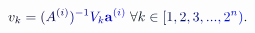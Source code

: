 \documentclass[12pt]{article}
\begin{document}
\makeatletter
\renewcommand*{\@textcolor}[3]{%
  \protect\leavevmode
  \begingroup
    \color#1{#2}#3%
  \endgroup
}
\makeatother
\begin{displaymath}
\mathcolor[RGB]{0,0,15}{v} _ { \mathcolor[RGB]{0,0,30}{k} } \mathcolor[RGB]{0,0,45}{=} \mathcolor[RGB]{0,0,60}{(} \mathcolor[RGB]{0,0,75}{A} ^ { \mathcolor[RGB]{0,0,90}{(} \mathcolor[RGB]{0,0,105}{i} \mathcolor[RGB]{0,0,120}{)} } \mathcolor[RGB]{0,0,135}{)} ^ { \mathcolor[RGB]{0,0,150}{-} \mathcolor[RGB]{0,0,165}{1} } \mathcolor[RGB]{0,0,180}{V} _ { \mathcolor[RGB]{0,0,195}{k} } \mathbf { \mathcolor[RGB]{0,0,210}{a} } ^ { \mathcolor[RGB]{0,0,225}{(} \mathcolor[RGB]{0,0,240}{i} \mathcolor[RGB]{0,0,255}{)} } \mathcolor[RGB]{0,15,0}{\;} \mathcolor[RGB]{0,15,15}{\forall} \mathcolor[RGB]{0,15,30}{k} \mathcolor[RGB]{0,15,45}{\in} \mathcolor[RGB]{0,15,60}{[} \mathcolor[RGB]{0,15,75}{1} \mathcolor[RGB]{0,15,90}{,} \mathcolor[RGB]{0,15,105}{2} \mathcolor[RGB]{0,15,120}{,} \mathcolor[RGB]{0,15,135}{3} \mathcolor[RGB]{0,15,150}{,} \mathcolor[RGB]{0,15,165}{.} \mathcolor[RGB]{0,15,180}{.} \mathcolor[RGB]{0,15,195}{.} \mathcolor[RGB]{0,15,210}{,} \mathcolor[RGB]{0,15,225}{2} ^ { \mathcolor[RGB]{0,15,240}{n} } \mathcolor[RGB]{0,15,255}{)} \mathcolor[RGB]{0,30,0}{.}
\end{displaymath}
\end{document}
